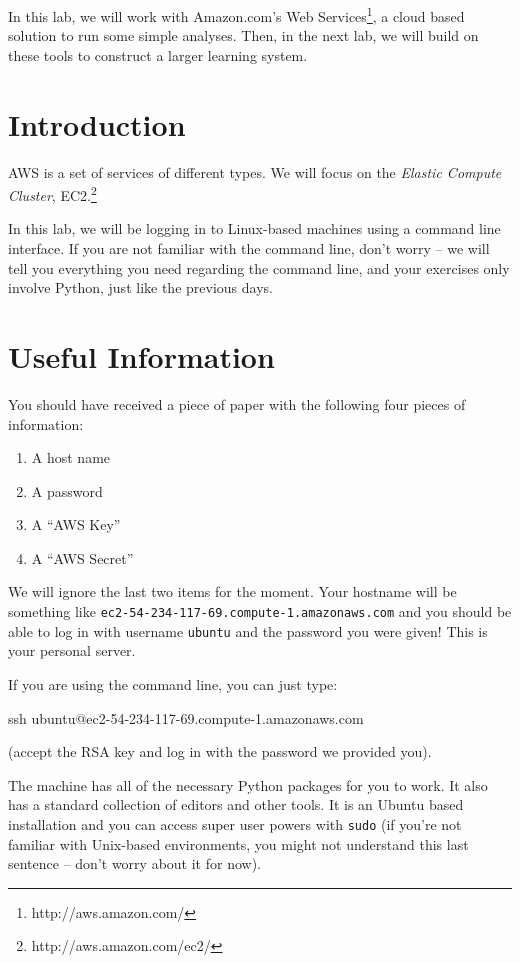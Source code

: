 In this lab, we will work with Amazon.com's Web Services\footnote{http://aws.amazon.com/}, a cloud based solution
to run some simple analyses. Then, in the next lab, we will build on these
tools to construct a larger learning system.

\section{Introduction}

AWS is a set of services of different types. We will focus on the \emph{Elastic
Compute Cluster}, EC2.\footnote{http://aws.amazon.com/ec2/}

In this lab, we will be logging in to Linux-based machines using a command line
interface. If you are not familiar with the command line, don't worry -- we will tell you everything you need regarding the command line, and your exercises only involve Python, just like the previous days.

\section{Useful Information}

You should have received a piece of paper with the following four pieces of
information:

\begin{enumerate}
\item A host name
\item A password
\item A ``AWS Key''
\item A ``AWS Secret''
\end{enumerate}

We will ignore the last two items for the moment.  Your hostname will be
something like \texttt{ec2-54-234-117-69.compute-1.amazonaws.com} and you
should be able to log in with username \texttt{ubuntu} and the password you
were given! This is your personal server.

If you are using the command line, you can just type:

ssh ubuntu@ec2-54-234-117-69.compute-1.amazonaws.com

(accept the RSA key and log in with the password we provided you).

The machine has all of the necessary Python packages for you to work. It also
has a standard collection of editors and other tools. It is an Ubuntu based
installation and you can access super user powers with \texttt{sudo} (if you're not familiar with Unix-based environments, you might not understand this last sentence -- don't worry about it for now).


